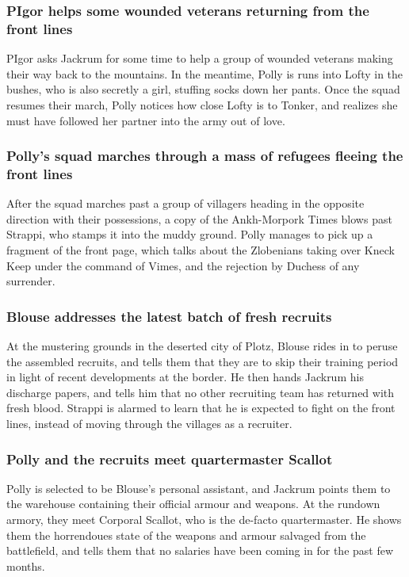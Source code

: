 \subsubsection{\Gls{PIgor} helps some wounded veterans returning from the front lines}
\Gls{PIgor} asks \Gls{Jackrum} for some time to help a group of wounded veterans making their way
back to the mountains. In the meantime, \Gls{Polly} is runs into \Gls{Lofty} in the bushes, who
is also secretly a girl, stuffing socks down her pants. Once the squad resumes their march,
\Gls{Polly} notices how close \Gls{Lofty} is to \Gls{Tonker}, and realizes she must have followed
her partner into the army out of love.

\subsubsection{\Gls{Polly}'s squad marches through a mass of refugees fleeing the front lines}
After the squad marches past a group of villagers heading in the opposite direction with their
possessions, a copy of the Ankh-Morpork Times blows past \Gls{Strappi}, who stamps it into the
muddy ground. \Gls{Polly} manages to pick up a fragment of the front page, which talks about the
Zlobenians taking over Kneck Keep under the command of \Gls{Vimes}, and the rejection by
\Gls{Duchess} of any surrender.

\subsubsection{\Gls{Blouse} addresses the latest batch of fresh recruits}
At the mustering grounds in the deserted city of Plotz, \Gls{Blouse} rides in to peruse the
assembled recruits, and tells them that they are to skip their training period in light of recent
developments at the border. He then hands \Gls{Jackrum} his discharge papers, and tells him that no
other recruiting team has returned with fresh blood. \Gls{Strappi} is alarmed to learn that he is
expected to fight on the front lines, instead of moving through the villages as a recruiter.

\subsubsection{\Gls{Polly} and the recruits meet quartermaster \Gls{Scallot}}
\Gls{Polly} is selected to be \Gls{Blouse}'s personal assistant, and \Gls{Jackrum} points them to
the warehouse containing their official armour and weapons. At the rundown armory, they meet
Corporal \Gls{Scallot}, who is the de-facto quartermaster. He shows them the horrendoues state of
the weapons and armour salvaged from the battlefield, and tells them that no salaries have been
coming in for the past few months.


